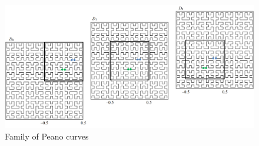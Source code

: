 \documentclass[entropy,article,submit,moreauthors,pdftex]{Definitions/mdpi}
\begin{document}
\begin{figure}	
\widefigure
\includegraphics[width=1.0\linewidth]{fig2.png}
\caption{Family of Peano curves\label{fig2}}
\end{figure}  
\end{document}
